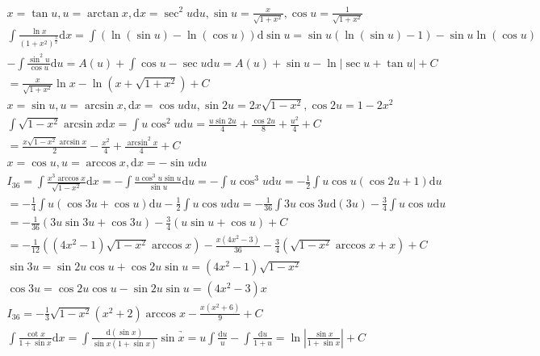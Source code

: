 \documentclass{article}
\begin{document}
\clearpage 

\begin{align*}
    x = \tan u , u = \arctan x , \mathrm{d}x = \sec^2 u \mathrm{d}u , \sin u = \frac{x}{\sqrt{1+x^2}} , \cos u =\frac{1}{\sqrt{{1+x^2}}} \\
    \int \frac{\ln x}{(1+x^2)^{\frac{3}{2}}} \mathrm{d}x = \int ( \ln(\sin u) - \ln(\cos u) ) \mathrm{d}\sin u = \sin u(\ln(\sin u )-1) -\sin u\ln(\cos u) \\ 
    - \int \frac{\sin^2 u}{\cos u}\mathrm{d}u = A(u) + \int \cos u - \sec u \mathrm{d}u = A(u) + \sin u - \ln |\sec u + \tan u| + C \\ 
    = \frac{x}{\sqrt{1+x^2}}\ln x - \ln(x+\sqrt{1+x^2}) + C \\
    x = \sin u , u = \arcsin x , \mathrm{d}x = \cos u \mathrm{d}u , \sin 2u = 2x\sqrt{1-x^2} , \cos 2u = 1-2x^2\\ 
    \int \sqrt{1-x^2}\arcsin x\mathrm{d}x = \int u\cos^2 u \mathrm{d}u = \frac{u\sin 2u}{4} + \frac{\cos 2u}{8} + \frac{u^2}{4} + C \\
    = \frac{x\sqrt{1-x^2}\arcsin x}{2} - \frac{x^2}{4} + \frac{\arcsin^2 x}{4} + C\\
    x = \cos u , u =\arccos x , \mathrm{d}x = -\sin u \mathrm{d} u\\
    I_{36} = \int \frac{x^3\arccos x}{\sqrt{1-x^2}} \mathrm{d}x = -\int \frac{u \cos^3 u \sin u}{\sin u}\mathrm{d}u = -\int u \cos^3 u \mathrm{d}u = -\frac{1}{2} \int u\cos u(\cos 2u + 1) \mathrm{d}u \\ 
    = -\frac{1}{4} \int u(\cos 3u +\cos u) \mathrm{d} u -\frac{1}{2} \int u\cos u \mathrm{d}u = -\frac{1}{36} \int 3u \cos 3u \mathrm{d}(3u) - \frac{3}{4} \int u\cos u \mathrm{d}u \\
    = -\frac{1}{36}\left(3u\sin 3u + \cos 3u\right) -\frac{3}{4}\left(u\sin u + \cos u\right) + C \\ 
    = -\frac{1}{12}((4x^2-1)\sqrt{1-x^2}\arccos x) - \frac{x(4x^2-3)}{36} - \frac{3}{4}(\sqrt{1-x^2}\arccos x + x) + C \\
    \sin 3u = \sin 2u \cos u + \cos 2u \sin u = (4x^2-1)\sqrt{1-x^2} \\ 
    \cos 3u = \cos 2u \cos u - \sin 2u \sin u = (4x^2-3)x \\
    I_{36} = -\frac{1}{3}\sqrt{1-x^2}(x^2+2)\arccos x -\frac{x(x^2+6)}{9} + C \\ 
    \int \frac{\cot x}{1+\sin x} \mathrm{d}x = \int \frac{\mathrm{d}(\sin x) }{\sin x(1+\sin x)} \underrightarrow{\sin x = u } \int \frac{\mathrm{d}u}{u} - \int \frac{\mathrm{d}u}{1 + u} = \ln \left|\frac{\sin x}{1+\sin x}\right| + C \\

\end{align*}
\end{document}
